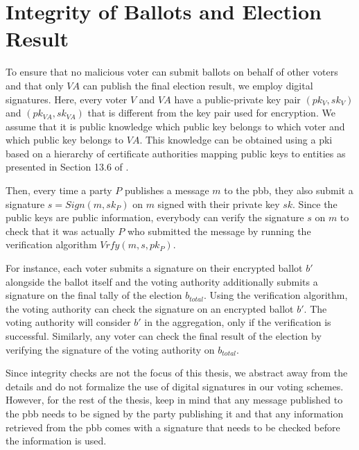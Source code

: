 \newpage
\section{Integrity of Ballots and Election Result}
To ensure that no malicious voter can submit ballots on behalf of other voters and that only $VA$ can publish the final election result, we employ digital signatures.
Here, every voter $V$ and $VA$ have a public-private key pair $(pk_V, sk_V)$ and $(pk_{VA}, sk_{VA})$ that is different from the key pair used for encryption.
We assume that it is public knowledge which public key belongs to which voter and which public key belongs to $VA$.
This knowledge can be obtained using a \gls{pki} based on a hierarchy of certificate authorities mapping public keys to entities as presented in Section 13.6 of \cite{katz_introduction_2021}.

Then, every time a party $P$ publishes a message $m$ to the \gls{pbb}, they also submit a signature $s=Sign(m, sk_P)$ on $m$ signed with their private key $sk$.
Since the public keys are public information, everybody can verify the signature $s$ on $m$ to check that it was actually $P$ who submitted the message by running the verification algorithm $Vrfy(m, s, pk_P)$.

For instance, each voter submits a signature on their encrypted ballot $b'$ alongside the ballot itself and the voting authority additionally submits a signature on the final tally of the election $b_{total}$.
Using the verification algorithm, the voting authority can check the signature on an encrypted ballot $b'$.
The voting authority will consider $b'$ in the aggregation, only if the verification is successful.
Similarly, any voter can check the final result of the election by verifying the signature of the voting authority on $b_{total}$.


Since integrity checks are not the focus of this thesis, we abstract away from the details and do not formalize the use of digital signatures in our voting schemes.
However, for the rest of the thesis, keep in mind that any message published to the \gls{pbb} needs to be signed by the party publishing it and that any information retrieved from the \gls{pbb} comes with a signature that needs to be checked before the information is used.

